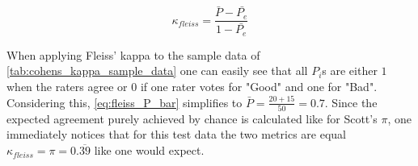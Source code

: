 \begin{equation}\label{eq:fleiss_kappa}
    \kappa_{fleiss} = \frac{\bar{P}-\bar{P_e}}{1-\bar{P_e}}
\end{equation}

When applying Fleiss' kappa to the sample data of \cref{tab:cohens_kappa_sample_data} one can easily see that all $P_i$s are either $1$ when the raters agree or $0$ if one rater votes for "Good" and one for "Bad".
Considering this, \cref{eq:fleiss_P_bar} simplifies to $\bar{P} = \frac{20+15}{50} = 0.7$.
Since the expected agreement purely achieved by chance is calculated like for Scott's $\pi$, one immediately notices that for this test data the two metrics are equal $\kappa_{fleiss} = \pi = 0.\overline{39}$ like one would expect.
